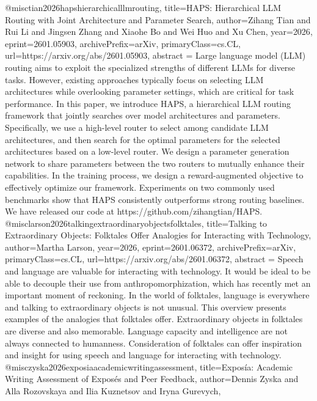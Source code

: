 {}@misc{tian2026hapshierarchicalllmrouting,
      title={HAPS: Hierarchical LLM Routing with Joint Architecture and Parameter Search}, 
      author={Zihang Tian and Rui Li and Jingsen Zhang and Xiaohe Bo and Wei Huo and Xu Chen},
      year={2026},
      eprint={2601.05903},
      archivePrefix={arXiv},
      primaryClass={cs.CL},
      url={https://arxiv.org/abs/2601.05903},
      abstract = {Large language model (LLM) routing aims to exploit the specialized strengths of different LLMs for diverse tasks. However, existing approaches typically focus on selecting LLM architectures while overlooking parameter settings, which are critical for task performance. In this paper, we introduce HAPS, a hierarchical LLM routing framework that jointly searches over model architectures and parameters. Specifically, we use a high-level router to select among candidate LLM architectures, and then search for the optimal parameters for the selected architectures based on a low-level router. We design a parameter generation network to share parameters between the two routers to mutually enhance their capabilities. In the training process, we design a reward-augmented objective to effectively optimize our framework. Experiments on two commonly used benchmarks show that HAPS consistently outperforms strong routing baselines. We have released our code at https://github.com/zihangtian/HAPS.}
}@misc{larson2026talkingextraordinaryobjectsfolktales,
      title={Talking to Extraordinary Objects: Folktales Offer Analogies for Interacting with Technology}, 
      author={Martha Larson},
      year={2026},
      eprint={2601.06372},
      archivePrefix={arXiv},
      primaryClass={cs.CL},
      url={https://arxiv.org/abs/2601.06372},
      abstract = {Speech and language are valuable for interacting with technology. It would be ideal to be able to decouple their use from anthropomorphization, which has recently met an important moment of reckoning. In the world of folktales, language is everywhere and talking to extraordinary objects is not unusual. This overview presents examples of the analogies that folktales offer. Extraordinary objects in folktales are diverse and also memorable. Language capacity and intelligence are not always connected to humanness. Consideration of folktales can offer inspiration and insight for using speech and language for interacting with technology.}
}@misc{zyska2026exposiaacademicwritingassessment,
      title={Expos\'ia: Academic Writing Assessment of Expos\'es and Peer Feedback}, 
      author={Dennis Zyska and Alla Rozovskaya and Ilia Kuznetsov and Iryna Gurevych},
}
